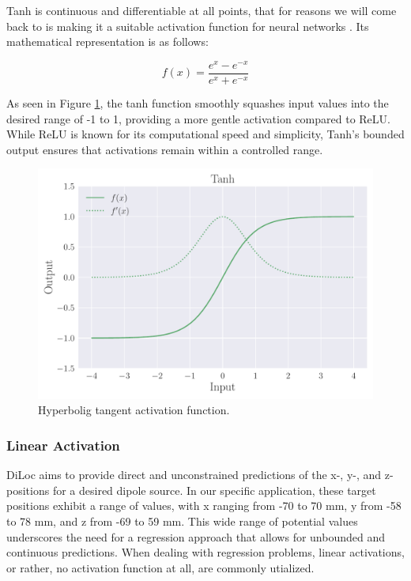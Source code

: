 \documentclass[a4paper, UKenglish, 11pt]{uiomaster}
\begin{document}
Tanh is continuous and differentiable at all points, that for reasons we will come back to is making it a suitable activation function for neural networks . Its mathematical representation is as follows:

\begin{equation}
  f(x) = \frac{{e^x - e^{-x}}}{{e^x + e^{-x}}}
\label{eq:I}
\end{equation}

As seen in Figure \ref{fig:Tanh}, the tanh function smoothly squashes input values into the desired range of -1 to 1, providing a more gentle activation compared to ReLU. While ReLU is known for its computational speed and simplicity, Tanh's bounded output ensures that activations remain within a controlled range.

\begin{figure}
    \centering
    \includegraphics[width=\linewidth]{figures/Tanh.pdf}
    \caption{Hyperbolig tangent activation function.}
    \label{fig:Tanh}
\end{figure}


\subsubsection{Linear Activation}
DiLoc aims to provide direct and unconstrained predictions of the x-, y-, and z-positions for a desired dipole source. In our specific application, these target positions exhibit a range of values, with x ranging from -70 to 70 mm, y from -58 to 78 mm, and z from -69 to 59 mm. This wide range of potential values underscores the need for a regression approach that allows for unbounded and continuous predictions. When dealing with regression problems, linear activations, or rather, no activation function at all, are commonly utialized.
\end{document}

